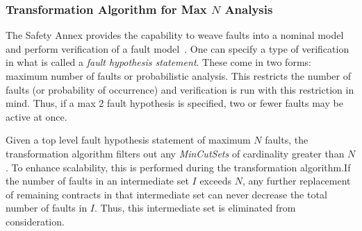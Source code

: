 \subsubsection{Transformation Algorithm for Max $N$ Analysis}
The Safety Annex provides the capability to weave faults into a nominal model and perform verification of a fault model~\cite{stewart2020safety}. One can specify a type of verification in what is called a \textit{fault hypothesis statement}. These come in two forms: maximum number of faults or probabilistic analysis. This restricts the number of faults (or probability of occurrence) and verification is run with this restriction in mind. Thus, if a max 2 fault hypothesis is specified, two or fewer faults may be active at once. 

Given a top level fault hypothesis statement of maximum $N$ faults, the transformation algorithm filters out any \textit{MinCutSets} of cardinality greater than $N$. To enhance scalability, this is performed during the transformation algorithm.If the number of faults in an intermediate set $I$ exceeds $N$, any further replacement of remaining contracts in that intermediate set can never decrease the total number of faults in $I$. Thus, this intermediate set is eliminated from consideration.










































